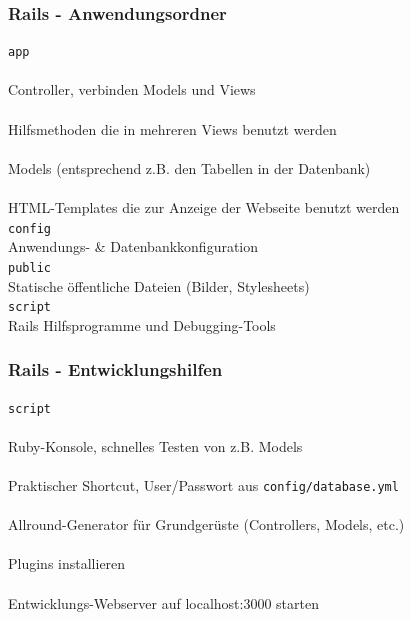\begin{frame}
  \frametitle{Rails - Anwendungsordner}
  \small
  {\tt app} \\
   \\ \enskip\enskip Controller, verbinden Models und Views \\
   \\ \enskip\enskip Hilfsmethoden die in mehreren Views benutzt werden \\
   \\ \enskip\enskip Models (entsprechend z.B. den Tabellen in der Datenbank) \\
   \\ \enskip\enskip HTML-Templates die zur Anzeige der Webseite benutzt werden \\
  {\tt config} \\ \enskip\enskip Anwendungs- \& Datenbankkonfiguration \\
  {\tt public} \\ \enskip\enskip Statische öffentliche Dateien (Bilder, Stylesheets) \\
  {\tt script} \\ \enskip\enskip Rails Hilfsprogramme und Debugging-Tools \\
\end{frame}

\begin{frame}
  \frametitle{Rails - Entwicklungshilfen}
  \small
  {\tt script} \\
   \\ \enskip\enskip Ruby-Konsole, schnelles Testen von z.B. Models\\
   \\ \enskip\enskip Praktischer Shortcut, User/Passwort aus {\tt config/database.yml} \\
   \\ \enskip\enskip Allround-Generator für Grundgerüste (Controllers, Models, etc.) \\
   \\ \enskip\enskip Plugins installieren \\
   \\ \enskip\enskip Entwicklungs-Webserver auf localhost:3000 starten
\end{frame}

